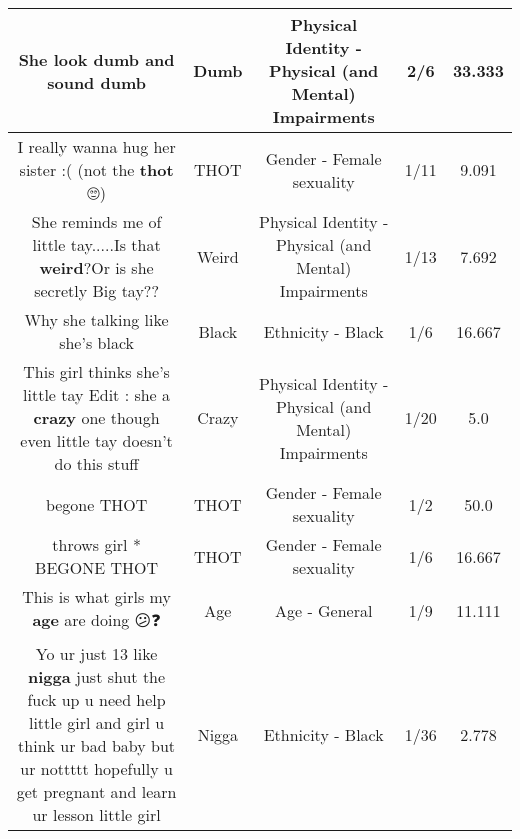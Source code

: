 \documentclass[11pt]{article}
\newlength\mylength
\begin{document}
\begin{center}
\begin{longtable}{|C{.65\mylength}|C{.30\mylength}|C{.12\mylength}|C{.12\mylength}|C{.12\mylength}|}
  \small She look \textbf{dumb} and sound dumb\normalsize   & Dumb & Physical Identity - Physical (and Mental) Impairments & 2/6 & 33.333 \\  \hline
  \small I really wanna hug her sister :( (not the \textbf{thot} 🙄)\normalsize   & THOT & Gender - Female sexuality & 1/11 & 9.091 \\  \hline
  \small She reminds me of little tay.....Is that \textbf{weird}?Or is she secretly Big tay??\normalsize   & Weird & Physical Identity - Physical (and Mental) Impairments & 1/13 & 7.692 \\  \hline
  \small Why she talking like she's black\normalsize   & Black & Ethnicity - Black & 1/6 & 16.667 \\  \hline
  \small This girl thinks she's little tay Edit : she a \textbf{crazy} one though even little tay doesn't do this stuff\normalsize   & Crazy & Physical Identity - Physical (and Mental) Impairments & 1/20 & 5.0 \\  \hline
  \small begone THOT\normalsize   & THOT & Gender - Female sexuality & 1/2 & 50.0 \\  \hline
  \small * throws girl * BEGONE THOT\normalsize   & THOT & Gender - Female sexuality & 1/6 & 16.667 \\  \hline
  \small This is what girls my \textbf{age} are doing 😕❓\normalsize   & Age & Age - General & 1/9 & 11.111 \\  \hline
  \small Yo ur just 13 like \textbf{nigga} just shut the fuck up u need help little girl and girl u think ur bad baby but ur nottttt hopefully u get pregnant and learn ur lesson little girl\normalsize   & Nigga & Ethnicity - Black & 1/36 & 2.778 \\  \hline

\end{longtable}
\end{center}
\end{document}
